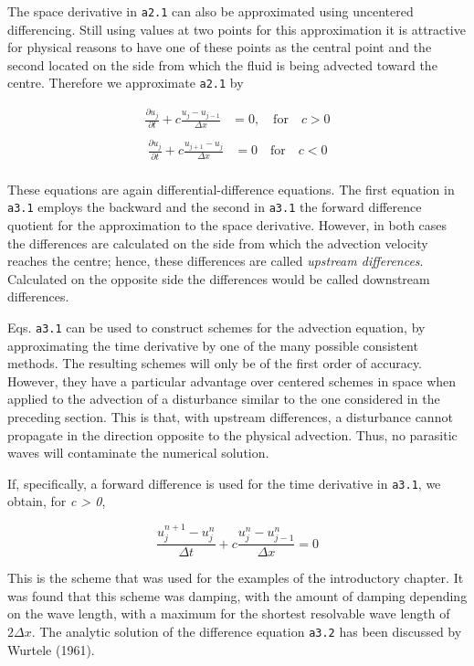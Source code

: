 The space derivative in \texttt{a2.1} can also be approximated using
uncentered differencing. Still using values at two points for this
approximation it is attractive for physical reasons to have one of these
points as the central point and the second located on the side from
which the fluid is being advected toward the centre. Therefore we
approximate \texttt{a2.1} by

 \[\begin{aligned}
     \frac{\partial u_j}{\partial t} + c\frac{u_{j} - u_{j - 1}}{\Delta x} &= 0, \quad \textrm{for}
     \quad c > 0 \\
\end{aligned}\]\[\begin{aligned}
                  \frac{\partial u_j}{\partial t} + c\frac{u_{j+1} - u_{j}}{\Delta x} &= 0 \quad \textrm{for}
                  \quad c < 0 \\
\end{aligned}\]

These equations are again differential-difference equations. The first
equation in \texttt{a3.1} employs the backward and the second in
\texttt{a3.1} the forward difference quotient for the approximation to
the space derivative. However, in both cases the differences are
calculated on the side from which the advection velocity reaches the
centre; hence, these differences are called \emph{upstream differences}.
Calculated on the opposite side the differences would be called
downstream differences.

Eqs. \texttt{a3.1} can be used to construct schemes for the advection
equation, by approximating the time derivative by one of the many
possible consistent methods. The resulting schemes will only be of the
first order of accuracy. However, they have a particular advantage over
centered schemes in space when applied to the advection of a disturbance
similar to the one considered in the preceding section. This is that,
with upstream differences, a disturbance cannot propagate in the
direction opposite to the physical advection. Thus, no parasitic waves
will contaminate the numerical solution.

If, specifically, a forward difference is used for the time derivative
in \texttt{a3.1}, we obtain, for \emph{c \textgreater{} 0},

 \[\frac{u_j^{n + 1} - u_j^{n}}{\Delta t}
+c \frac{u_j^{n} - u_{j - 1}^{n}}{\Delta x} = 0\]

This is the scheme that was used for the examples of the introductory
chapter. It was found that this scheme was damping, with the amount of
damping depending on the wave length, with a maximum for the shortest
resolvable wave length of \(2\Delta x\). The analytic solution of the
difference equation \texttt{a3.2} has been discussed by Wurtele (1961).

